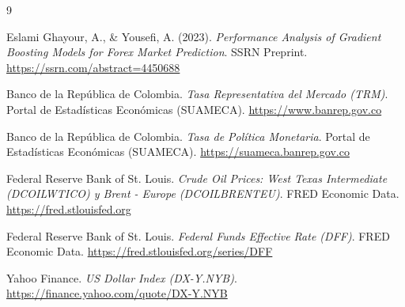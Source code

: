 \documentclass[11pt,letterpaper]{article}
\begin{document}
  \begin{thebibliography}{9}

  Eslami Ghayour, A., \& Yousefi, A. (2023). \textit{Performance Analysis of Gradient Boosting Models for Forex Market Prediction}. SSRN Preprint. \url{https://ssrn.com/abstract=4450688}

  Banco de la República de Colombia. \textit{Tasa Representativa del Mercado (TRM)}. Portal de Estadísticas Económicas (SUAMECA). \url{https://www.banrep.gov.co}

  Banco de la República de Colombia. \textit{Tasa de Política Monetaria}. Portal de Estadísticas Económicas (SUAMECA). \url{https://suameca.banrep.gov.co}

  Federal Reserve Bank of St. Louis. \textit{Crude Oil Prices: West Texas Intermediate (DCOILWTICO) y Brent - Europe (DCOILBRENTEU)}. FRED Economic Data. \url{https://fred.stlouisfed.org}

  Federal Reserve Bank of St. Louis. \textit{Federal Funds Effective Rate (DFF)}. FRED Economic Data. \url{https://fred.stlouisfed.org/series/DFF}

  Yahoo Finance. \textit{US Dollar Index (DX-Y.NYB)}. \url{https://finance.yahoo.com/quote/DX-Y.NYB}

  \end{thebibliography}

  
\end{document}
